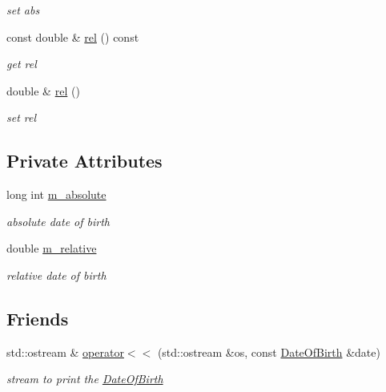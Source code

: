 \begin{DoxyCompactItemize}
\begin{DoxyCompactList}\small\item\em set abs \end{DoxyCompactList}\item 
\hypertarget{classDateOfBirth_a00324f71b547eb938030effcb5249eb7}{
const double \& \hyperlink{classDateOfBirth_a00324f71b547eb938030effcb5249eb7}{rel} () const }
\label{classDateOfBirth_a00324f71b547eb938030effcb5249eb7}

\begin{DoxyCompactList}\small\item\em get rel \end{DoxyCompactList}\item 
\hypertarget{classDateOfBirth_a3e050eecd8749371d3d8c21d76f146dd}{
double \& \hyperlink{classDateOfBirth_a3e050eecd8749371d3d8c21d76f146dd}{rel} ()}
\label{classDateOfBirth_a3e050eecd8749371d3d8c21d76f146dd}

\begin{DoxyCompactList}\small\item\em set rel \end{DoxyCompactList}\end{DoxyCompactItemize}
\subsection*{Private Attributes}
\begin{DoxyCompactItemize}
\item 
long int \hyperlink{classDateOfBirth_a3f2be0fbfb187a421301d50c768784ba}{m\_\-absolute}
\begin{DoxyCompactList}\small\item\em absolute date of birth \end{DoxyCompactList}\item 
double \hyperlink{classDateOfBirth_a4e0f255eaf334e4e35a49aceee5df28d}{m\_\-relative}
\begin{DoxyCompactList}\small\item\em relative date of birth \end{DoxyCompactList}\end{DoxyCompactItemize}
\subsection*{Friends}
\begin{DoxyCompactItemize}
\item 
\hypertarget{classDateOfBirth_abc2fd3b2388c85ad5f2399f4f250df3a}{
std::ostream \& \hyperlink{classDateOfBirth_abc2fd3b2388c85ad5f2399f4f250df3a}{operator$<$$<$} (std::ostream \&os, const \hyperlink{classDateOfBirth}{DateOfBirth} \&date)}
\label{classDateOfBirth_abc2fd3b2388c85ad5f2399f4f250df3a}

\begin{DoxyCompactList}\small\item\em stream to print the \hyperlink{classDateOfBirth}{DateOfBirth} \end{DoxyCompactList}\end{DoxyCompactItemize}


